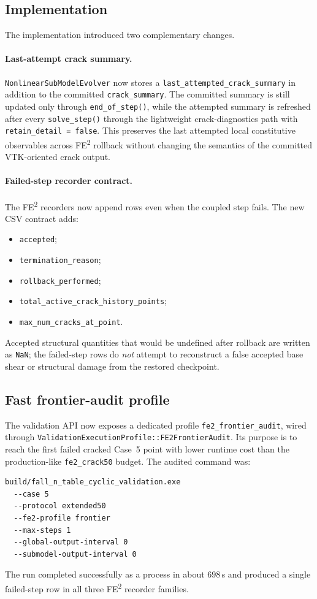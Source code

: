 \subsection{Implementation}

The implementation introduced two complementary changes.

\paragraph{Last-attempt crack summary.}
\texttt{NonlinearSubModelEvolver} now stores a
\texttt{last\_attempted\_crack\_summary} in addition to the committed
\texttt{crack\_summary}.  The committed summary is still updated only through
\texttt{end\_of\_step()}, while the attempted summary is refreshed after every
\texttt{solve\_step()} through the lightweight crack-diagnostics path with
\texttt{retain\_detail = false}.  This preserves the last attempted local
constitutive observables across FE\textsuperscript{2} rollback without
changing the semantics of the committed VTK-oriented crack output.

\paragraph{Failed-step recorder contract.}
The FE\textsuperscript{2} recorders now append rows even when the coupled step
fails.  The new CSV contract adds:
\begin{itemize}
  \item \texttt{accepted};
  \item \texttt{termination\_reason};
  \item \texttt{rollback\_performed};
  \item \texttt{total\_active\_crack\_history\_points};
  \item \texttt{max\_num\_cracks\_at\_point}.
\end{itemize}
Accepted structural quantities that would be undefined after rollback are
written as \texttt{NaN}; the failed-step rows do \emph{not} attempt to
reconstruct a false accepted base shear or structural damage from the restored
checkpoint.

\subsection{Fast frontier-audit profile}

The validation API now exposes a dedicated profile
\texttt{fe2\_frontier\_audit}, wired through
\texttt{ValidationExecutionProfile::FE2FrontierAudit}.  Its purpose is to
reach the first failed cracked Case~5 point with lower runtime cost than the
production-like \texttt{fe2\_crack50} budget.  The audited command was:
\begin{verbatim}
build/fall_n_table_cyclic_validation.exe
  --case 5
  --protocol extended50
  --fe2-profile frontier
  --max-steps 1
  --global-output-interval 0
  --submodel-output-interval 0
\end{verbatim}
The run completed successfully as a process in about \(698\)\,s and produced a
single failed-step row in all three FE\textsuperscript{2} recorder families.

